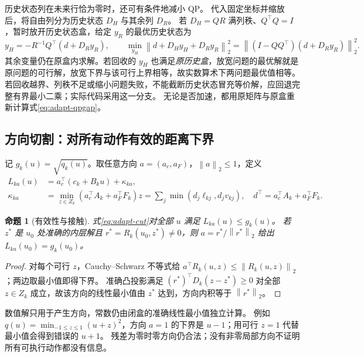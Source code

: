 \documentclass[UTF8,fontset=fandol,11pt,a4paper]{ctexart}
\newtheorem{proposition}{命题}
\newcommand{\norm}[1]{\left\lVert#1\right\rVert}
\begin{document}
历史状态列在未来行恰为零时，还可有条件地减小 QP。
代入固定坐标并缩放后，将自由列分为历史状态 $D_H$ 与其余列 $D_R$。
若 $D_H=QR$ 满列秩、$Q^\top Q=I$，暂时放开历史状态盒，给定 $y_R$ 的最优历史状态为
\begin{equation}
 y_H=-R^{-1}Q^\top(d+D_Ry_R),\qquad
 \min_{y_H}\norm{d+D_Hy_H+D_Ry_R}_2^2
 =\norm{(I-QQ^\top)(d+D_Ry_R)}_2^2.
 \label{eq:adapt-qr}
\end{equation}
其余变量仍在原盒内求解。若回收的 $y_H$ 也满足\emph{原历史盒}，放宽问题的最优解就是原问题的可行解，放宽下界与该可行上界相等，故实数算术下两问题最优值相等。
若回收越界、列秩不足或缩小问题失败，不能截断历史状态冒充等价解，应回退完整有界最小二乘；实际代码采用这一分支。
无论是否加速，都用原矩阵与原盒重新计算式\eqref{eq:adapt-qpgap}。

\subsection{方向切割：对所有动作有效的距离下界}
记 $g_k(u)=\sqrt{q_k(u)}$。取任意方向 $a=(a_c,a_F)$，$\norm{a}_2\le1$，定义
\begin{align}
 L_{ka}(u)&=a_c^\top(c_k+B_ku)+\kappa_{ka},\label{eq:adapt-cut}\\
 \kappa_{ka}&=\min_{z\in Z_k}(a_c^\top A_k+a_F^\top F_k)z
 =\sum_j\min(d_j\ell_{kj},d_jv_{kj}),\quad
 d^\top=a_c^\top A_k+a_F^\top F_k.\nonumber
\end{align}
\begin{proposition}[有效性与接触]
式\eqref{eq:adapt-cut}对全部 $u$ 满足 $L_{ka}(u)\le g_k(u)$。
若 $z^*$ 是 $u_0$ 处准确的内层解且 $r^*=R_k(u_0,z^*)\ne0$，则 $a=r^*/\norm{r^*}_2$ 给出 $L_{ka}(u_0)=g_k(u_0)$。
\end{proposition}
\begin{proof}
对每个可行 $z$，Cauchy--Schwarz 不等式给 $a^\top R_k(u,z)\le\norm{R_k(u,z)}_2$；两边取最小值即得下界。
准确凸投影满足 $(r^*)^\top D_k(z-z^*)\ge0$ 对全部 $z\in Z_k$ 成立，故该方向的线性最小值由 $z^*$ 达到，方向内积等于 $\norm{r^*}_2$。
\end{proof}
数值解只用于产生方向，常数仍由闭盒的准确线性最小值独立计算。
例如 $q(u)=\min_{-1\le z\le1}(u+z)^2$，方向 $a=1$ 的下界是 $u-1$；用可行 $z=1$ 代替最小值会得到错误的 $u+1$。
残差为零时零方向仍合法；没有非零局部方向不证明所有可执行动作都没有信息。
\end{document}
